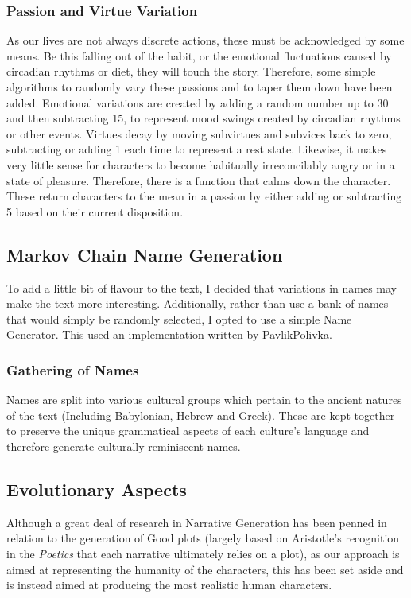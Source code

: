 \documentclass[11pt]{article}
\begin{document}
\subsubsection{Passion and Virtue Variation} 
As our lives are not always discrete actions, these must be acknowledged by some means. Be this falling out of the habit, or the emotional fluctuations caused by circadian rhythms or diet, they will touch the story. Therefore, some simple algorithms to randomly vary these passions and to taper them down have been added. Emotional variations are created by adding a random number up to 30 and then subtracting 15, to represent mood swings created by circadian rhythms or other events. Virtues decay by moving subvirtues and subvices back to zero, subtracting or adding 1 each time to represent a rest state. Likewise, it makes very little sense for characters to become habitually irreconcilably angry or in a state of pleasure. Therefore, there is a function that calms down the character. These return characters to the mean in a passion by either adding or subtracting 5 based on their current disposition. \\
\subsection{Markov Chain Name Generation}
To add a little bit of flavour to the text, I decided that variations in names may make the text more interesting. Additionally, rather than use a bank of names that would simply be randomly selected, I opted to use a simple Name Generator. This used an implementation written by PavlikPolivka.

\subsubsection{Gathering of Names}
Names are split into various cultural groups which pertain to the ancient natures of the text (Including Babylonian, Hebrew and Greek). These are kept together to preserve the unique grammatical aspects of each culture's language and therefore generate culturally reminiscent names. 

\subsection{Evolutionary Aspects}
Although a great deal of research in Narrative Generation has been penned in relation to the generation of Good plots (largely based on Aristotle's recognition in the \textit{Poetics} that each narrative ultimately relies on a plot), as our approach is aimed at representing the humanity of the characters, this has been set aside and is instead aimed at producing the most realistic human characters. 
\end{document}
